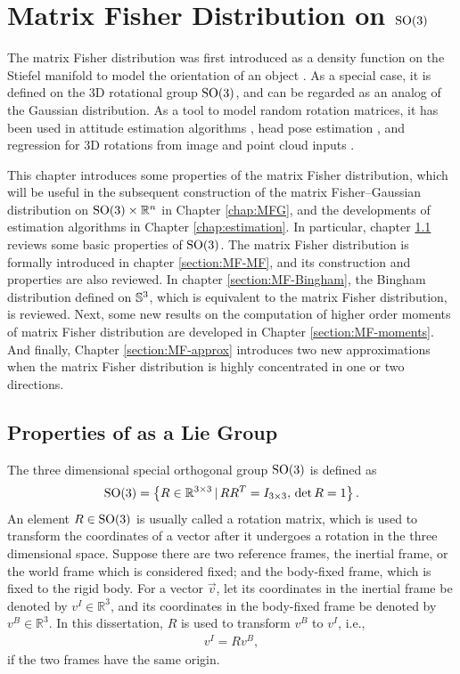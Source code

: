 
\chapter{Matrix Fisher Distribution on $\mathrm{SO}(3)$} \label{chap:MF}

The matrix Fisher distribution was first introduced as a density function on the Stiefel manifold to model the orientation of an object \cite{downs1972orientation}.
As a special case, it is defined on the 3D rotational group $\mathrm{SO}(3)$, and can be regarded as an analog of the Gaussian distribution.
As a tool to model random rotation matrices, it has been used in attitude estimation algorithms \cite{lee2018bayesian}, head pose estimation \cite{liu2021mfdnet}, and regression for 3D rotations from image and point cloud inputs \cite{mohlin2020probabilistic,yin2022fishermatch}.

This chapter introduces some properties of the matrix Fisher distribution, which will be useful in the subsequent construction of the matrix Fisher--Gaussian distribution on $\mathrm{SO}(3)\times \mathbb{R}^n$ in Chapter \ref{chap:MFG}, and the developments of estimation algorithms in Chapter \ref{chap:estimation}.
In particular, chapter \ref{section:MF-SO(3)} reviews some basic properties of $\mathrm{SO}(3)$.
The matrix Fisher distribution is formally introduced in chapter \ref{section:MF-MF}, and its construction and properties are also reviewed.
In chapter \ref{section:MF-Bingham}, the Bingham distribution defined on $\mathbb{S}^3$, which is equivalent to the matrix Fisher distribution, is reviewed.
Next, some new results on the computation of higher order moments of matrix Fisher distribution are developed in Chapter \ref{section:MF-moments}.
And finally, Chapter \ref{section:MF-approx} introduces two new approximations when the matrix Fisher distribution is highly concentrated in one or two directions.

\section{Properties of  as a Lie Group} \label{section:MF-SO(3)}

The three dimensional special orthogonal group $\mathrm{SO}(3)$ is defined as
\begin{align}
	\mathrm{SO}(3) = \left\{ R\in\mathbb{R}^{3\times 3} \,|\, RR^T = I_{3\times 3},\, \det R = 1 \right\}.
\end{align}
An element $R\in\mathrm{SO}(3)$ is usually called a rotation matrix, which is used to transform the coordinates of a vector after it undergoes a rotation in the three dimensional space.
Suppose there are two reference frames, the inertial frame, or the world frame which is considered fixed; and the body-fixed frame, which is fixed to the rigid body.
For a vector $\vec{v}$, let its coordinates in the inertial frame be denoted by $v^I \in \mathbb{R}^3$, and its coordinates in the body-fixed frame be denoted by $v^B \in \mathbb{R}^3$.
In this dissertation, $R$ is used to transform $v^B$ to $v^I$, i.e.,
\begin{align}
	v^I = Rv^B,
\end{align}
if the two frames have the same origin.

